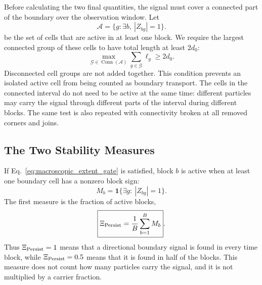 \documentclass[11pt]{article}
\numberwithin{equation}{section}
\begin{document}
Before calculating the two final quantities, the signal must cover a connected
part of the boundary over the observation window.  Let
\begin{equation}
  \mathcal A=\{g:\exists b,\ |Z_{bg}|=1\}.
  \label{eq:active_gate_union}
\end{equation}
be the set of cells that are active in at least one block.  We require the
largest connected group of these cells to have total length at least $2d_0$:
\begin{equation}
  \max_{\mathcal G\in\operatorname{Conn}(\mathcal A)}
  \sum_{g\in\mathcal G}\ell_g\ge2d_0.
  \label{eq:macroscopic_extent_gate}
\end{equation}
Disconnected cell groups are not added together.  This condition prevents an
isolated active cell from being counted as boundary transport.  The cells in
the connected interval do not need to be active at the same time: different
particles may carry the signal through different parts of the interval during
different blocks.  The same test is also repeated with connectivity broken at
all removed corners and joins.

\subsection{The Two Stability Measures}

If Eq.~\eqref{eq:macroscopic_extent_gate} is satisfied, block $b$ is active
when at least one boundary cell has a nonzero block sign:
\begin{equation}
  M_b=\mathbf 1\{\exists g:\ |Z_{bg}|=1\}.
  \label{eq:active_boundary_block}
\end{equation}
The first measure is the fraction of active blocks,
\begin{equation}
  \boxed{
  \Xi_{\rm Persist}=\frac{1}{B}\sum_{b=1}^{B}M_b
  }.
  \label{eq:xi_persist}
\end{equation}
Thus $\Xi_{\rm Persist}=1$ means that a directional boundary signal is found in
every time block, while $\Xi_{\rm Persist}=0.5$ means that it is found in half
of the blocks.  This measure does not count how many particles carry the
signal, and it is not multiplied by a carrier fraction.
\end{document}

